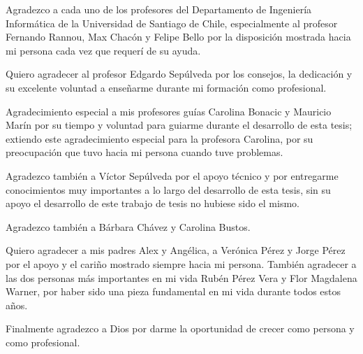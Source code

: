\begin{gracias}
Agradezco a cada uno de los profesores del Departamento de Ingeniería Informática de la Universidad de Santiago de Chile, especialmente al profesor Fernando Rannou, Max Chacón y Felipe Bello por la disposición mostrada hacia mi persona cada vez que requerí de su ayuda. 

Quiero agradecer al profesor Edgardo Sepúlveda por los consejos, la dedicación y su excelente voluntad a enseñarme durante mi formación como profesional.

Agradecimiento especial a mis profesores guías Carolina Bonacic y Mauricio Marín por su tiempo y voluntad para guiarme durante el desarrollo de esta tesis; extiendo este agradecimiento especial para la profesora Carolina, por su preocupación que tuvo hacia mi persona cuando tuve problemas. 

Agradezco también a Víctor Sepúlveda por el apoyo técnico y por entregarme conocimientos muy importantes a lo largo del desarrollo de esta tesis, sin su apoyo el desarrollo de este trabajo de tesis no hubiese sido el mismo.

Agradezco también a Bárbara Chávez y Carolina Bustos.

Quiero agradecer a mis padres Alex y Angélica, a Verónica Pérez y Jorge Pérez por el apoyo y el cariño mostrado siempre hacia mi persona. También agradecer a las dos personas más importantes en mi vida Rubén Pérez Vera y Flor Magdalena Warner, por haber sido una pieza fundamental en mi vida durante todos estos años.

Finalmente agradezco a Dios por darme la oportunidad de crecer como persona y como profesional.

\end{gracias}